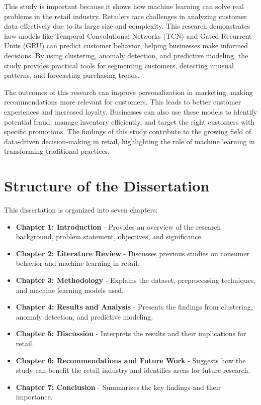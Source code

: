 \documentclass[12pt, a4paper,twoside]{report}
\theoremstyle{plain} %
\theoremstyle{definition} %
\theoremstyle{remark} %
\numberwithin{equation}{chapter}
\begin{document}
This study is important because it shows how machine learning can solve real problems in the retail industry. Retailers face challenges in analyzing customer data effectively due to its large size and complexity. This research demonstrates how models like Temporal Convolutional Networks (TCN) and Gated Recurrent Units (GRU) can predict customer behavior, helping businesses make informed decisions. By using clustering, anomaly detection, and predictive modeling, the study provides practical tools for segmenting customers, detecting unusual patterns, and forecasting purchasing trends.

The outcomes of this research can improve personalization in marketing, making recommendations more relevant for customers. This leads to better customer experiences and increased loyalty. Businesses can also use these models to identify potential fraud, manage inventory efficiently, and target the right customers with specific promotions. The findings of this study contribute to the growing field of data-driven decision-making in retail, highlighting the role of machine learning in transforming traditional practices.

\section{Structure of the Dissertation}

This dissertation is organized into seven chapters:

\begin{itemize}
    \item \textbf{Chapter 1: Introduction} - Provides an overview of the research background, problem statement, objectives, and significance.
    \item \textbf{Chapter 2: Literature Review} - Discusses previous studies on consumer behavior and machine learning in retail.
    \item \textbf{Chapter 3: Methodology} - Explains the dataset, preprocessing techniques, and machine learning models used.
    \item \textbf{Chapter 4: Results and Analysis} - Presents the findings from clustering, anomaly detection, and predictive modeling.
    \item \textbf{Chapter 5: Discussion} - Interprets the results and their implications for retail.
    \item \textbf{Chapter 6: Recommendations and Future Work} - Suggests how the study can benefit the retail industry and identifies areas for future research.
    \item \textbf{Chapter 7: Conclusion} - Summarizes the key findings and their importance.
\end{itemize}
\end{document}
